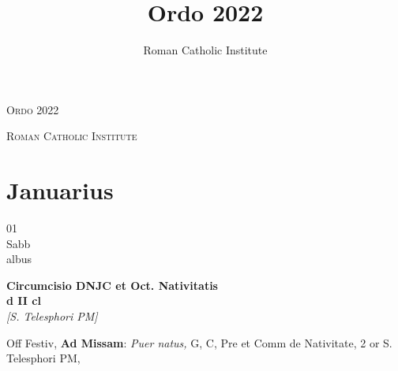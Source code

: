 \documentclass[10pt, openany]{book}
\title{Ordo 2022}
\author{Roman Catholic Institute}
\begin{document}
        \begin{titlepage}
            \begin{center}
                {\fontsize{50}{60}\selectfont \textsc{Ordo 2022}}
            \end{center}
            \begin{center}
                {\footnotesize \textsc{Roman Catholic Institute}}
            \end{center}
        \end{titlepage}
        \clearpage\begingroup\pagestyle{empty}\cleardoublepage\endgroup
    
        \chapter{Januarius}
                        
        \begin{center}
            \begin{minipage}{3.5in}
                \vspace{2em}
                \begin{minipage}{0.5in}
                    {\Huge 01} \\
                    {\normalsize Sabb} \\
                    {\normalsize albus}
                \end{minipage}
                \begin{minipage}{3.0in}
                    \textbf{ \large Circumcisio DNJC et Oct. Nativitatis \\
                    \textnormal{\normalsize d II cl}} \\ \textit{[S. Telesphori PM]} \\ 
                \end{minipage}
                \begin{justify}Off Festiv, \textbf{Ad Missam}: \textit{Puer natus,} G, C, Pre et Comm de Nativitate, 2 or S. Telesphori PM,  
                \end{justify}
            \end{minipage}
        \end{center}
    
\end{document}
